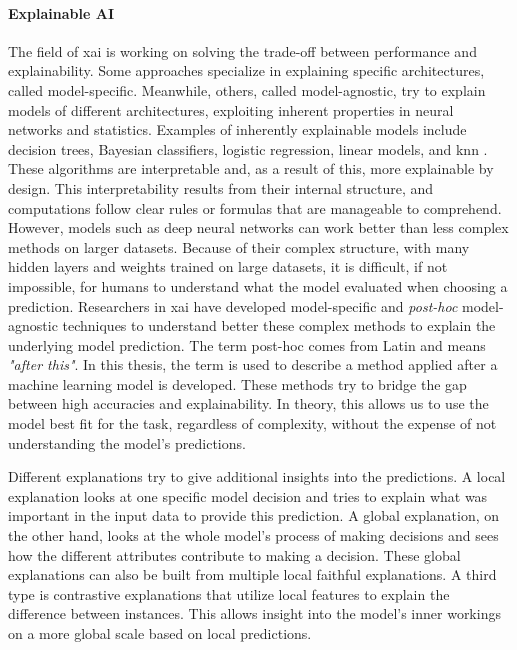 \paragraph{Explainable AI\\}
The field of \gls{xai} is working on solving the trade-off between performance and explainability. Some approaches specialize in explaining specific architectures, called model-specific. Meanwhile, others, called model-agnostic, try to explain models of different architectures, exploiting inherent properties in neural networks and statistics. Examples of inherently explainable models include decision trees, Bayesian classifiers, logistic regression, linear models, and \gls{knn} \cite{fixDiscriminatoryAnalysisNonparametric1989, coverNearestNeighborPattern1967, molnarInterpretableMachineLearning}. These algorithms are interpretable and, as a result of this, more explainable by design. This interpretability results from their internal structure, and computations follow clear rules or formulas that are manageable to comprehend.
However, models such as deep neural networks can work better than less complex methods on larger datasets. Because of their complex structure, with many hidden layers and weights trained on large datasets, it is difficult, if not impossible, for humans to understand what the model evaluated when choosing a prediction. Researchers in \gls{xai} have developed model-specific and \textit{post-hoc} model-agnostic techniques to understand better these complex methods to explain the underlying model prediction. The term post-hoc comes from Latin and means \textit{"after this"}. In this thesis, the term is used to describe a method applied after a machine learning model is developed. These methods try to bridge the gap between high accuracies and explainability.
In theory, this allows us to use the model best fit for the task, regardless of complexity, without the expense of not understanding the model's predictions. 

Different explanations try to give additional insights into the predictions. A local explanation looks at one specific model decision and tries to explain what was important in the input data to provide this prediction. A global explanation, on the other hand, looks at the whole model's process of making decisions and sees how the different attributes contribute to making a decision. These global explanations can also be built from multiple local faithful explanations. A third type is contrastive explanations that utilize local features to explain the difference between instances. This allows insight into the model's inner workings on a more global scale based on local predictions.

